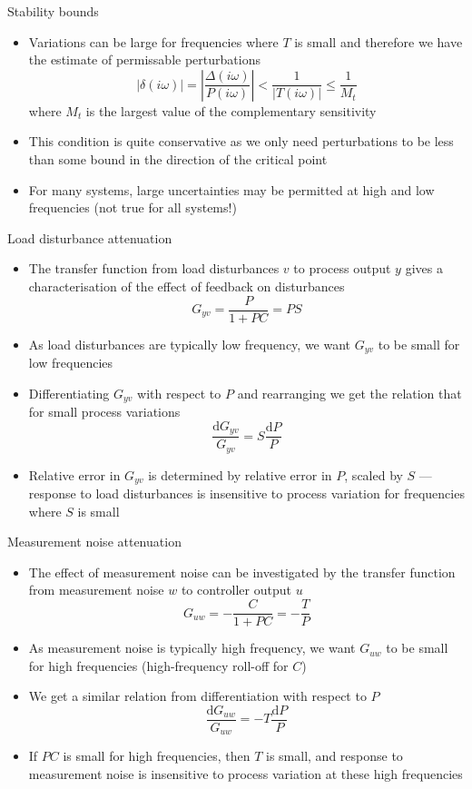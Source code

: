 \documentclass{beamer-control}
\begin{document}
\begin{frame}{Stability bounds}
	\begin{itemize}
		\item Variations can be large for frequencies where $T$ is small and therefore we have the estimate of permissable perturbations
		\[|\delta(i\omega)|=\left|\frac{\Delta(i\omega)}{P(i\omega)} \right| <\frac{1}{|T(i\omega)|}\leq \frac{1}{M_t}\]
		where $M_t$ is the largest value of the complementary sensitivity
		\item This condition is quite conservative as we only need perturbations to be less than some bound in the direction of the critical point
		\item For many systems, large uncertainties may be permitted at high and low frequencies (not true for all systems!)
	\end{itemize}
\end{frame}





\begin{frame}{Load disturbance attenuation}
\begin{itemize}
\item The transfer function from load disturbances $v$ to process output $y$ gives a characterisation of the effect of feedback on disturbances
\[G_{yv}=\frac{P}{1+PC}=PS\]
\item As load disturbances are typically low frequency, we want $G_{yv}$ to be small for low frequencies
\item Differentiating $G_{yv}$ with respect to $P$ and rearranging we get the relation that for small process variations
\[\frac{\mathrm{d}G_{yv}}{G_{yv}}=S\frac{\mathrm{d}P}{P}\]
\item Relative error in $G_{yv}$ is determined by relative error in $P$, scaled by $S$ --- response to load disturbances is insensitive to process variation for frequencies where $S$ is small
\end{itemize}
\end{frame}


\begin{frame}{Measurement noise attenuation}
	\begin{itemize}
		\item The effect of measurement noise can be investigated by the transfer function from measurement noise $w$ to controller output $u$
		\[G_{uw}=-\frac{C}{1+PC}=-\frac{T}{P}\]
		\item As measurement noise is typically high frequency, we want $G_{uw}$ to be small for high frequencies (high-frequency roll-off for $C$)
		\item We get a similar relation from differentiation with respect to $P$
		\[\frac{\mathrm{d}G_{uw}}{G_{uw}}=-T\frac{\mathrm{d}P}{P}\]
		\item If $PC$ is small for high frequencies, then $T$ is small, and response to measurement noise is insensitive to process variation at these high frequencies
	\end{itemize}
\end{frame}
\end{document}
